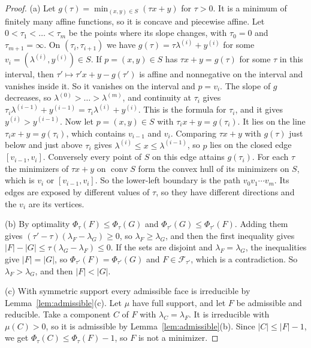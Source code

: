 \begin{proof}
(a) Let $g(\tau)=\min_{(x,y)\in S}(\tau x+y)$ for $\tau>0$. It is a minimum of
finitely many affine functions, so it is concave and piecewise affine. Let
$0<\tau_1<\dots<\tau_m$ be the points where its slope changes, with
$\tau_0=0$ and $\tau_{m+1}=\infty$. On $(\tau_i,\tau_{i+1})$ we have
$g(\tau)=\tau\lambda^{(i)}+y^{(i)}$ for some
$v_i=(\lambda^{(i)},y^{(i)})\in S$. If $p=(x,y)\in S$ has $\tau x+y=g(\tau)$
for some $\tau$ in this interval, then $\tau'\mapsto\tau'x+y-g(\tau')$ is
affine and nonnegative on the interval and vanishes inside it. So it vanishes
on the interval and $p=v_i$. The slope of $g$ decreases, so
$\lambda^{(0)}>\dots>\lambda^{(m)}$, and continuity at $\tau_i$ gives
$\tau_i\lambda^{(i-1)}+y^{(i-1)}=\tau_i\lambda^{(i)}+y^{(i)}$. This is the
formula for $\tau_i$, and it gives $y^{(i)}>y^{(i-1)}$. Now let $p=(x,y)\in S$
with $\tau_ix+y=g(\tau_i)$. It lies on the line $\tau_ix+y=g(\tau_i)$, which
contains $v_{i-1}$ and $v_i$. Comparing $\tau x+y$ with $g(\tau)$ just below
and just above $\tau_i$ gives $\lambda^{(i)}\le x\le\lambda^{(i-1)}$, so $p$
lies on the closed edge $[v_{i-1},v_i]$. Conversely every point of $S$ on
this edge attains $g(\tau_i)$. For each $\tau$ the minimizers of $\tau x+y$ on
$\operatorname{conv}S$ form the convex hull of its minimizers on $S$, which is
$v_i$ or $[v_{i-1},v_i]$. So the lower-left boundary is the path
$v_0v_1\cdots v_m$. Its edges are exposed by different values of $\tau$, so
they have different directions and the $v_i$ are its vertices.

(b) By optimality $\Phi_\tau(F)\le\Phi_\tau(G)$ and
$\Phi_{\tau'}(G)\le\Phi_{\tau'}(F)$. Adding them gives
$(\tau'-\tau)(\lambda_F-\lambda_G)\ge0$, so $\lambda_F\ge\lambda_G$, and then
the first inequality gives
$\lvert F\rvert-\lvert G\rvert\le\tau(\lambda_G-\lambda_F)\le0$. If the
sets are disjoint and $\lambda_F=\lambda_G$, the inequalities give
$\lvert F\rvert=\lvert G\rvert$, so $\Phi_{\tau'}(F)=\Phi_{\tau'}(G)$ and
$F\in\mathcal F_{\tau'}$, which is a contradiction. So $\lambda_F>\lambda_G$,
and then $\lvert F\rvert<\lvert G\rvert$.

(c) With symmetric support every admissible face is irreducible by
Lemma~\ref{lem:admissible}(c). Let $\mu$ have full support, and let $F$ be
admissible and reducible. Take a component $C$ of $F$ with
$\lambda_C=\lambda_F$. It is irreducible with $\mu(C)>0$, so it is admissible
by Lemma~\ref{lem:admissible}(b). Since $\lvert C\rvert\le\lvert F\rvert-1$,
we get $\Phi_\tau(C)\le\Phi_\tau(F)-1$, so $F$ is not a minimizer.
\end{proof}


